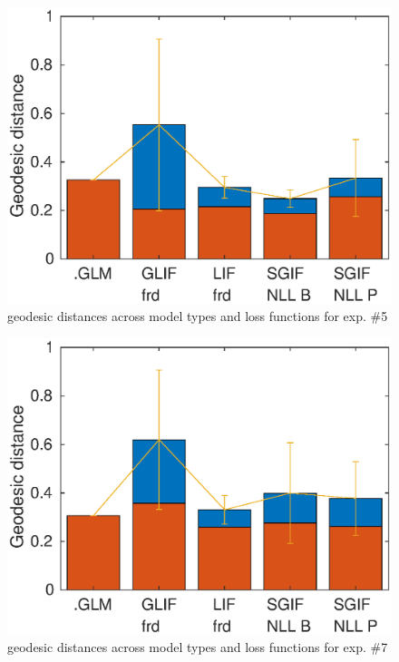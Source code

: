\documentclass[mphil,deptreport,ianc]{infthesis} %
\begin{document}
\begin{figure}
    \centering
    \includegraphics[width=0.65\columnwidth]{figures/sleep/geodesic_exp138.eps}
    \caption{geodesic distances across model types and loss functions for exp. \#5}
    \label{fig:geodesic_distances_exp5}
\end{figure}


\begin{figure}
    \centering
    \includegraphics[width=0.65\columnwidth]{figures/sleep/geodesic_exp147.eps}
    \caption{geodesic distances across model types and loss functions for exp. \#7}
    \label{fig:geodesic_distances_exp7}
\end{figure}
\end{document}
